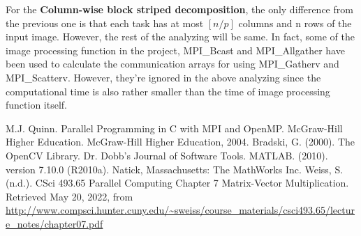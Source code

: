 \documentclass[12pt]{diazessay}
\begin{document}
For the \textbf{Column-wise block striped decomposition}, the only difference from the previous one is that each task has at most $[n/p]$ columns and n rows of the input image. However, the rest of the analyzing will be same. In fact, some of the image processing function in the project, MPI\_Bcast and MPI\_Allgather have been used to calculate the communication arrays for using MPI\_Gatherv and MPI\_Scatterv. However, they're ignored in the above analyzing since the computational time is also rather smaller than the time of image processing function itself.
 



\clearpage
\begin{thebibliography}{00}
M.J. Quinn. Parallel Programming in C with MPI and OpenMP. McGraw-Hill Higher Education. McGraw-Hill Higher Education, 2004.
Bradski, G. (2000). The OpenCV Library. Dr. Dobb's Journal of Software Tools.
MATLAB. (2010). version 7.10.0 (R2010a). Natick, Massachusetts: The MathWorks Inc.
Weiss, S. (n.d.). CSci 493.65 Parallel Computing Chapter 7 Matrix-Vector Multiplication. Retrieved May 20, 2022, from \url{http://www.compsci.hunter.cuny.edu/~sweiss/course_materials/csci493.65/lecture_notes/chapter07.pdf }

\end{thebibliography}
\end{document}
